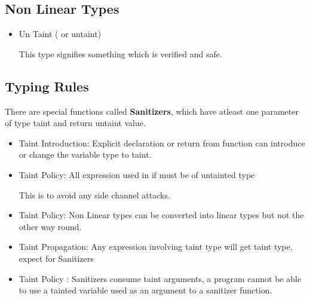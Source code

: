 \documentclass[11pt, pdftex]{article}
\begin{document}
\subsection{Non Linear Types}
\begin{itemize}
\item Un Taint ( or untaint)
\begin{description}
This type signifies something which is verified and safe.
\end{description}
\end{itemize}
\subsection{Typing Rules}
There are special functions called {\bf Sanitizers}, which have atleast one parameter of type taint and return untaint value.
\begin{itemize}
\item Taint Introduction: Explicit declaration or return from function can introduce or change the variable type to taint.
\item Taint Policy: All expression used in if must be of untainted type
\begin{description}
This is to avoid any side channel attacks.
\end{description}
\item Taint Policy: Non Linear types can be converted into linear types but not the other way round.
\item Taint Propagation: Any expression involving taint type will get taint type, expect for Sanitizers
\item Taint Policy : Sanitizers consume taint arguments, a program cannot be able to use a tainted variable used as an argument to a sanitizer function.
\end{itemize}
\end{document}
